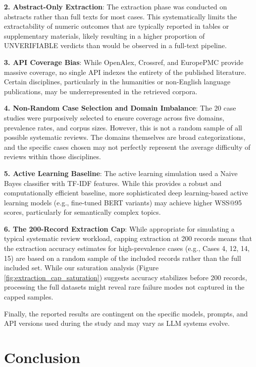\documentclass[12pt]{article}
\begin{document}
\textbf{2. Abstract-Only Extraction}: The extraction phase was conducted on abstracts rather than full texts for most cases. This systematically limits the extractability of numeric outcomes that are typically reported in tables or supplementary materials, likely resulting in a higher proportion of UNVERIFIABLE verdicts than would be observed in a full-text pipeline.

\textbf{3. API Coverage Bias}: While OpenAlex, Crossref, and EuropePMC provide massive coverage, no single API indexes the entirety of the published literature. Certain disciplines, particularly in the humanities or non-English language publications, may be underrepresented in the retrieved corpora.

\textbf{4. Non-Random Case Selection and Domain Imbalance}: The 20 case studies were purposively selected to ensure coverage across five domains, prevalence rates, and corpus sizes. However, this is not a random sample of all possible systematic reviews. The domains themselves are broad categorizations, and the specific cases chosen may not perfectly represent the average difficulty of reviews within those disciplines.

\textbf{5. Active Learning Baseline}: The active learning simulation used a Naive Bayes classifier with TF-IDF features. While this provides a robust and computationally efficient baseline, more sophisticated deep learning-based active learning models (e.g., fine-tuned BERT variants) may achieve higher WSS@95 scores, particularly for semantically complex topics.

\textbf{6. The 200-Record Extraction Cap}: While appropriate for simulating a typical systematic review workload, capping extraction at 200 records means that the extraction accuracy estimates for high-prevalence cases (e.g., Cases 4, 12, 14, 15) are based on a random sample of the included records rather than the full included set. While our saturation analysis (Figure \ref{fig:extraction_cap_saturation}) suggests accuracy stabilizes before 200 records, processing the full datasets might reveal rare failure modes not captured in the capped samples.

Finally, the reported results are contingent on the specific models, prompts, and API versions used during the study and may vary as LLM systems evolve.

\section{Conclusion}
\end{document}
